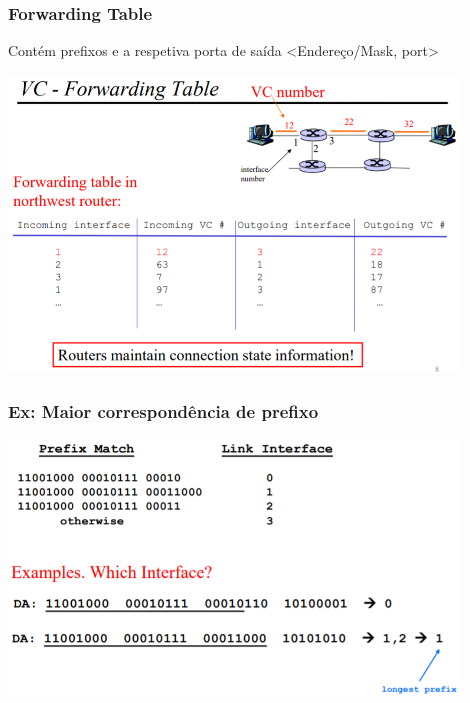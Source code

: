 \documentclass{article}
\begin{document}
\subsubsection{Forwarding Table}
Contém prefixos e a respetiva porta de saída <Endereço/Mask, port>
\begin{center} 
    \includegraphics[width=12cm]{images/RCOM1.png}
\end{center}
\subsubsection{Ex: Maior correspondência de prefixo}
\begin{center}            
    \includegraphics[width=12cm]{images/RCOM4.png}
\end{center}
\end{document}
